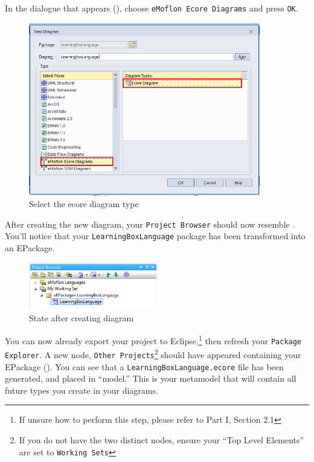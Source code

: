 \begin{stepbystep}
\clearpage

\item In the dialogue that appears (), choose \texttt{eMoflon Ecore Diagrams} and press \texttt{OK}. 

\begin{figure}[htbp]
	\centering
  \includegraphics[width=0.9\textwidth]{../../org.moflon.doc.handbook.02_leitnersLearningBox/2_staticSemantics/1_newStart/nsVisImages/ea_chooseDiagramType}
	\caption{Select the ecore diagram type}
	\label{ea:diagramType}
\end{figure}
\FloatBarrier

 
\item After creating the new diagram, your  \texttt{Project Browser} should now resemble . You'll notice
that your \texttt{LearningBoxLanguage} package has been transformed into an EPackage.

\begin{figure}[htbp]
	\centering
  \includegraphics[width=0.5\textwidth]{../../org.moflon.doc.handbook.02_leitnersLearningBox/2_staticSemantics/1_newStart/nsVisImages/ea_afterDiagramState}
	\caption{State after creating diagram}
	\label{ea:diagramComplete}
\end{figure}
\FloatBarrier

\item You can now already export your project to Eclipse,\footnote{If unsure how to perform this step, please refer to Part I, Section
2.1} then refresh your \texttt{Package Explorer}. A new node, \texttt{Other Projects}\footnote{If you do not have the two distinct nodes, ensure your ``Top
Level Elements'' are set to \texttt{Working Sets}} should have appeared containing your EPackage (). You can see that a
\texttt{Lear\-ning\-Box\-Lan\-guage.\-ecore} file has been generated, and placed in ``model.'' This is your metamodel that will contain all future types you create in
your diagrams.


\end{stepbystep}
